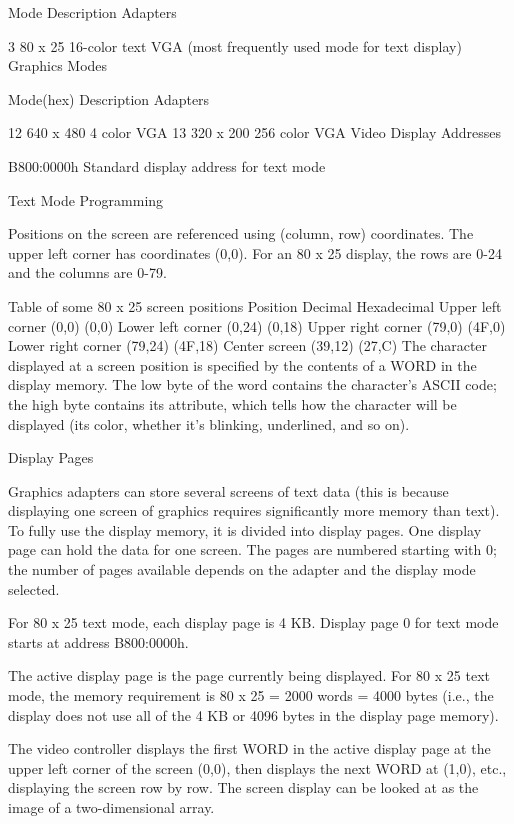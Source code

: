 \documentclass[11pt]{article}
\begin{document}
    Mode   Description                 Adapters

3    80 x 25    16-color text     VGA  (most frequently used mode for text display)
Graphics Modes

    Mode(hex) Description             Adapters

12       640 x 480   4 color     VGA
13       320 x 200  256 color    VGA   
Video Display Addresses

B800:0000h	  Standard display address for text mode

Text Mode Programming

Positions on the screen are referenced using (column, row) coordinates. The upper left corner has coordinates (0,0). For an 80 x 25 display, the rows are 0-24 and the columns are 0-79.

Table of some 80 x 25 screen positions
Position              Decimal      Hexadecimal
Upper left corner     (0,0)        (0,0)
Lower left corner     (0,24)       (0,18)
Upper right corner    (79,0)       (4F,0)
Lower right corner    (79,24)      (4F,18)
Center screen         (39,12)      (27,C)
The character displayed at a screen position is specified by the contents of a WORD in the display memory. The low byte of the word contains the character's ASCII code; the high byte contains its attribute, which tells how the character will be displayed (its color, whether it's blinking, underlined, and so on).

Display Pages

Graphics adapters can store several screens of text data (this is because displaying one screen of graphics requires significantly more memory than text). To fully use the display memory, it is divided into display pages. One display page can hold the data for one screen. The pages are numbered starting with 0; the number of pages available depends on the adapter and the display mode selected.

For 80 x 25 text mode, each display page is 4 KB.  Display page 0 for text mode starts at address B800:0000h. 

The active display page is the page currently being displayed. For 80 x 25 text mode, the memory requirement is 80 x 25 = 2000 words = 4000 bytes (i.e., the display does not use all of the 4 KB or 4096 bytes in the display page memory).

The video controller displays the first WORD in the active display page at the upper left corner of the screen (0,0), then displays the next WORD at (1,0), etc., displaying the screen row by row. The screen display can be looked at as the image of a two-dimensional array.
\end{document}

